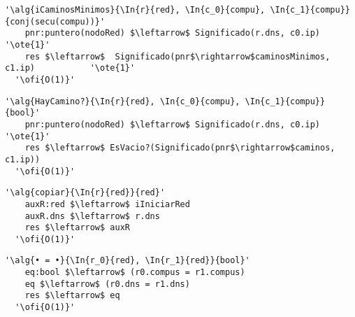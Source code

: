 \begin{lstlisting}[mathescape]
  '\alg{iCaminosMinimos}{\In{r}{red}, \In{c_0}{compu}, \In{c_1}{compu}}{conj(secu(compu))}'
    pnr:puntero(nodoRed) $\leftarrow$ Significado(r.dns, c0.ip)                    '\ote{1}'
    res $\leftarrow$  Significado(pnr$\rightarrow$caminosMinimos, c1.ip)           '\ote{1}'
  '\ofi{O(1)}'
\end{lstlisting}

\begin{lstlisting}[mathescape]
  '\alg{HayCamino?}{\In{r}{red}, \In{c_0}{compu}, \In{c_1}{compu}}{bool}'
    pnr:puntero(nodoRed) $\leftarrow$ Significado(r.dns, c0.ip)                    '\ote{1}'
    res $\leftarrow$ EsVacio?(Significado(pnr$\rightarrow$caminos, c1.ip))                                       
  '\ofi{O(1)}'
\end{lstlisting}

\begin{lstlisting}[mathescape]
  '\alg{copiar}{\In{r}{red}}{red}'
    auxR:red $\leftarrow$ iIniciarRed
    auxR.dns $\leftarrow$ r.dns
    res $\leftarrow$ auxR                                
  '\ofi{O(1)}'
\end{lstlisting}

\begin{lstlisting}[mathescape]
  '\alg{• = •}{\In{r_0}{red}, \In{r_1}{red}}{bool}'
    eq:bool $\leftarrow$ (r0.compus = r1.compus)
    eq $\leftarrow$ (r0.dns = r1.dns)
    res $\leftarrow$ eq                               
  '\ofi{O(1)}'
\end{lstlisting}


 